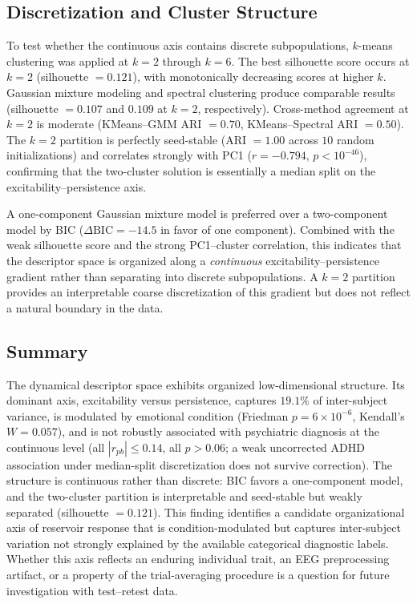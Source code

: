 \subsection{Discretization and Cluster Structure}

To test whether the continuous axis contains discrete subpopulations, $k$-means clustering was applied at $k = 2$ through $k = 6$. The best silhouette score occurs at $k = 2$ (silhouette $= 0.121$), with monotonically decreasing scores at higher $k$. Gaussian mixture modeling and spectral clustering produce comparable results (silhouette $= 0.107$ and $0.109$ at $k = 2$, respectively). Cross-method agreement at $k = 2$ is moderate (KMeans--GMM ARI $= 0.70$, KMeans--Spectral ARI $= 0.50$). The $k = 2$ partition is perfectly seed-stable (ARI $= 1.00$ across $10$ random initializations) and correlates strongly with PC1 ($r = -0.794$, $p < 10^{-46}$), confirming that the two-cluster solution is essentially a median split on the excitability--persistence axis.

A one-component Gaussian mixture model is preferred over a two-component model by BIC ($\Delta\text{BIC} = -14.5$ in favor of one component). Combined with the weak silhouette score and the strong PC1--cluster correlation, this indicates that the descriptor space is organized along a \emph{continuous} excitability--persistence gradient rather than separating into discrete subpopulations. A $k = 2$ partition provides an interpretable coarse discretization of this gradient but does not reflect a natural boundary in the data.

\subsection{Summary}

The dynamical descriptor space exhibits organized low-dimensional structure. Its dominant axis, excitability versus persistence, captures $19.1\%$ of inter-subject variance, is modulated by emotional condition (Friedman $p = 6 \times 10^{-6}$, Kendall's $W = 0.057$), and is not robustly associated with psychiatric diagnosis at the continuous level (all $|r_{pb}| \leq 0.14$, all $p > 0.06$; a weak uncorrected ADHD association under median-split discretization does not survive correction). The structure is continuous rather than discrete: BIC favors a one-component model, and the two-cluster partition is interpretable and seed-stable but weakly separated (silhouette $= 0.121$). This finding identifies a candidate organizational axis of reservoir response that is condition-modulated but captures inter-subject variation not strongly explained by the available categorical diagnostic labels. Whether this axis reflects an enduring individual trait, an EEG preprocessing artifact, or a property of the trial-averaging procedure is a question for future investigation with test--retest data.

